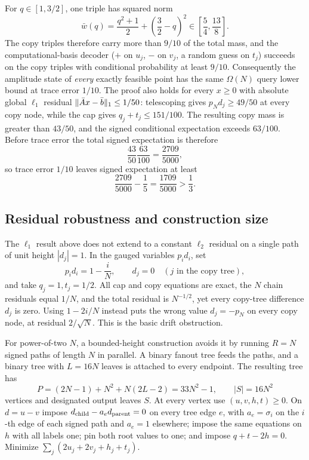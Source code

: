 For \(q\in[1,3/2]\), one triple has squared norm
\begin{equation}
 \bar w(q)=\frac{q^2+1}{2}+\left(\frac32-q\right)^2
 \in\left[\frac54,\frac{13}{8}\right].
\end{equation}
The copy triples therefore carry more than \(9/10\) of the total mass, and
the computational-basis decoder (\(+\) on \(u_j\), \(-\) on \(v_j\), a
random guess on \(t_j\)) succeeds on the copy triples with conditional
probability at least \(9/10\).  Consequently the amplitude state of
\emph{every} exactly feasible point has the same
\(\Omega(N)\) query lower bound at trace error \(1/10\).  The proof also
holds for every \(x\geq0\) with absolute global \(\ell_1\) residual
\(\lVert\bar Ax-\bar b\rVert_1\leq1/50\): telescoping gives
\(p_Nd_j\geq49/50\) at every copy node, while the cap gives
\(q_j+t_j\leq151/100\).  The resulting copy mass is greater than \(43/50\),
and the signed conditional expectation exceeds \(63/100\).  Before trace
error the total signed expectation is therefore
\begin{equation}
 \frac{43}{50}\frac{63}{100}=\frac{2709}{5000},
\end{equation}
so trace error \(1/10\) leaves signed expectation at least
\[
 \frac{2709}{5000}-\frac15=\frac{1709}{5000}>\frac13.
\]

\subsection{Residual robustness and construction size}
\label{sec:lp-robustness-frontier}

The \(\ell_1\) result above does not extend to a constant \(\ell_2\)
residual on a single path of unit height \(|d_j|=1\).  In the gauged
variables \(p_id_i\), set
\begin{equation}
 p_id_i=1-\frac{i}{N},\qquad d_j=0\quad(j\text{ in the copy tree}),
\end{equation}
and take \(q_j=1,t_j=1/2\).  All cap and copy equations are exact, the
\(N\) chain residuals equal \(1/N\), and the total residual is
\(N^{-1/2}\), yet every copy-tree difference \(d_j\) is zero.  Using
\(1-2i/N\) instead puts the wrong value \(d_j=-p_N\) on every copy node, at
residual \(2/\sqrt N\).  This is the basic drift obstruction.

For power-of-two \(N\), a bounded-height construction avoids it by running
\(R=N\) signed paths of length \(N\) in parallel.
A binary fanout tree feeds the paths, and a binary tree with \(L=16N\)
leaves is attached to every endpoint.  The resulting tree has
\begin{equation}
 P=(2N-1)+N^2+N(2L-2)=33N^2-1,
 \qquad |S|=16N^2
\end{equation}
vertices and designated output leaves \(S\).  At every vertex use
\((u,v,h,t)\geq0\).  On \(d=u-v\) impose
\(d_{\rm child}-a_ed_{\rm parent}=0\) on every tree edge \(e\), with
\(a_e=\sigma_i\) on the \(i\)-th edge of each signed path and \(a_e=1\)
elsewhere; impose the same equations on \(h\) with all labels one; pin both
root values to one; and impose \(q+t-2h=0\).  Minimize \(\sum_j(2u_j+2v_j+h_j+t_j)\).

